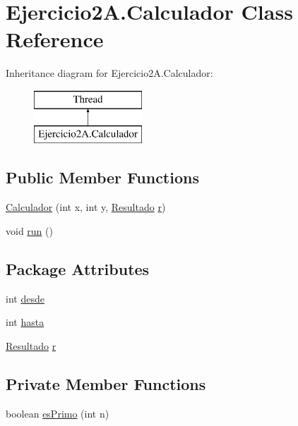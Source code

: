 \hypertarget{class_ejercicio2_a_1_1_calculador}{}\section{Ejercicio2\+A.\+Calculador Class Reference}
\label{class_ejercicio2_a_1_1_calculador}
Inheritance diagram for Ejercicio2\+A.\+Calculador\+:\begin{figure}[H]
\begin{center}
\leavevmode
\includegraphics[height=2.000000cm]{class_ejercicio2_a_1_1_calculador}
\end{center}
\end{figure}
\subsection*{Public Member Functions}
\begin{DoxyCompactItemize}
\item 
\mbox{\hyperlink{class_ejercicio2_a_1_1_calculador_aa26e86c9fd5acc5286690755c902a730}{Calculador}} (int x, int y, \mbox{\hyperlink{class_ejercicio2_a_1_1_resultado}{Resultado}} \mbox{\hyperlink{class_ejercicio2_a_1_1_calculador_aca421155f90fac2acf41c69639bbd940}{r}})
\item 
void \mbox{\hyperlink{class_ejercicio2_a_1_1_calculador_a08d293ab17364b4114ef07762e29dc27}{run}} ()
\end{DoxyCompactItemize}
\subsection*{Package Attributes}
\begin{DoxyCompactItemize}
\item 
int \mbox{\hyperlink{class_ejercicio2_a_1_1_calculador_a6ebfdfea1d0c6653247acb86c26a1074}{desde}}
\item 
int \mbox{\hyperlink{class_ejercicio2_a_1_1_calculador_adf1394308939996bb06ea2f9aaedb9ca}{hasta}}
\item 
\mbox{\hyperlink{class_ejercicio2_a_1_1_resultado}{Resultado}} \mbox{\hyperlink{class_ejercicio2_a_1_1_calculador_aca421155f90fac2acf41c69639bbd940}{r}}
\end{DoxyCompactItemize}
\subsection*{Private Member Functions}
\begin{DoxyCompactItemize}
\item 
boolean \mbox{\hyperlink{class_ejercicio2_a_1_1_calculador_a6036c26ba5a2d108d6316dc3ad2c52d2}{es\+Primo}} (int n)
\end{DoxyCompactItemize}


